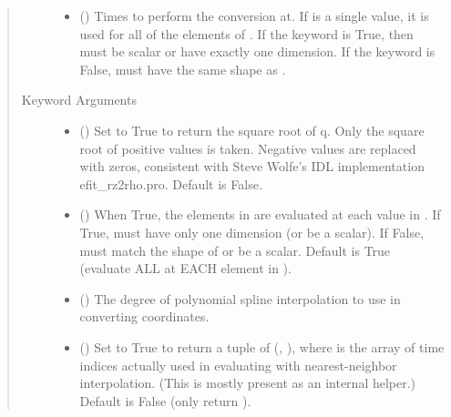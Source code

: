 \documentclass[letterpaper,10pt,english]{sphinxmanual}
\begin{document}
\begin{fulllineitems}
\begin{fulllineitems}
\begin{quote}
\begin{description}
\begin{itemize}
\item {} 
 () \textendash{} Times to perform the conversion at.
If  is a single value, it is used for all of the elements of
. If the  keyword is True, then  must be scalar
or have exactly one dimension. If the  keyword is False,
 must have the same shape as .

\end{itemize}

\item[{Keyword Arguments}] \leavevmode\begin{itemize}
\item {} 
 () \textendash{} Set to True to return the square root of q.
Only the square root of positive values is taken. Negative
values are replaced with zeros, consistent with Steve Wolfe’s
IDL implementation efit\_rz2rho.pro. Default is False.

\item {} 
 () \textendash{} When True, the elements in  are evaluated
at each value in . If True,  must have only one dimension
(or be a scalar). If False,  must match the shape of 
or be a scalar. Default is True (evaluate ALL  at EACH
element in ).

\item {} 
 () \textendash{} The degree of polynomial spline interpolation to
use in converting coordinates.

\item {} 
 () \textendash{} Set to True to return a tuple of (,
), where  is the array of time indices
actually used in evaluating  with nearest-neighbor
interpolation. (This is mostly present as an internal helper.)
Default is False (only return ).


\end{itemize}
\end{description}
\end{quote}
\end{fulllineitems}
\end{fulllineitems}
\end{document}
